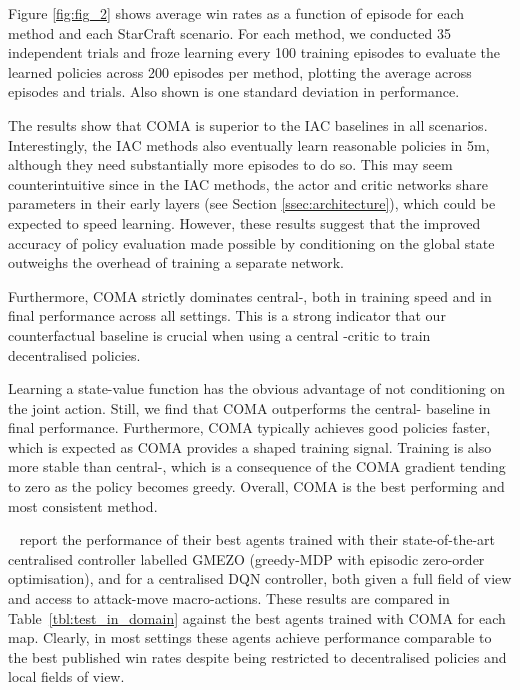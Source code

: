 \documentclass[letterpaper]{article}
\newcommand{\citet}[1]{\citeauthor{#1}~\shortcite{#1}}
\begin{document}
Figure \ref{fig:fig_2} shows average win rates as a function of episode
for each method and each StarCraft scenario. For each method, we conducted 35
independent trials and froze learning every 100 training episodes to evaluate
the learned policies across 200 episodes per method, plotting the average across
episodes and trials. Also shown is one standard deviation in performance.

The results show that COMA is superior to the IAC baselines in all scenarios. Interestingly, the IAC methods also eventually learn reasonable policies in
5m, although they need substantially more episodes to do so. This may seem
counterintuitive since in the IAC methods, the actor and critic networks share
parameters in their early layers (see Section
\ref{ssec:architecture}), which could be expected to speed learning. However, these 
results suggest that the improved accuracy of policy evaluation made 
possible by conditioning on the global state outweighs the overhead of training 
a separate network.

Furthermore, COMA strictly dominates \mbox{central-}, both in training 
speed and in final performance across all settings. This is a strong indicator 
that our counterfactual baseline is crucial when using a central -critic to 
train decentralised policies.

Learning a state-value function has the obvious advantage of not conditioning 
on the joint action. Still, we find that COMA outperforms the 
\mbox{central-} baseline in final performance. Furthermore, COMA typically achieves good 
policies faster, which is expected as COMA provides a shaped training signal. 
Training is also more stable  than \mbox{central-}, which is a consequence of the COMA gradient 
tending to zero as the policy becomes greedy. Overall, COMA is the best 
performing and most consistent method.

\citet{usunier2016episodic} report the performance of their best agents trained with their 
state-of-the-art centralised controller labelled GMEZO (greedy-MDP with 
episodic zero-order optimisation), and for a centralised DQN controller, both 
given a full field of view and access to attack-move macro-actions. These 
results are compared in Table~\ref{tbl:test_in_domain} against the best agents 
trained with COMA for each map. Clearly, in most settings these agents achieve 
performance comparable to the best published win rates despite being 
restricted to decentralised policies and local fields of view.

\end{document}
